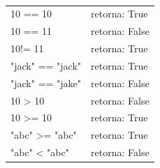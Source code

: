 \documentclass[landscape,a0paper,fontscale=0.285]{baposter} %
\begin{document}
\begin{poster}
{						\colorbox[HTML]{CCFFFF}{}
						\linebreak \\
						\begin{tabular}{l l}
							10 == 10 & retorna: True \\
							10 == 11 & retorna: False \\
							10!= 11 & retorna: True \\
							"jack" == "jack" & retorna: True \\
							"jack" == "jake" & retorna: False \\
							10 > 10 & retorna: False \\
							10 >= 10 & retorna: True \\
							"abc" >= "abc" & retorna: True \\
							"abc" < "abc" & retorna: False \\
						\end{tabular}
					}
					
					
					
\end{poster}
\end{document}
